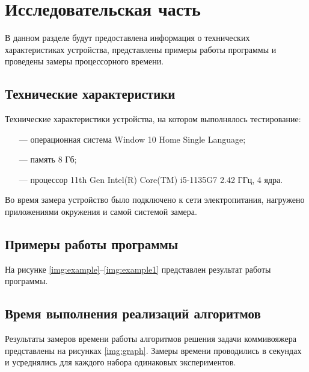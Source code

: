\chapter{Исследовательская часть}

В данном разделе будут предоставлена информация о технических характеристиках устройства, представлены примеры работы программы и проведены замеры процессорного времени.

\section{Технические характеристики}

Технические характеристики устройства, на котором выполнялось тестирование:

\begin{itemize}
	\item[---] операционная система Window 10 Home Single Language;
	\item[---] память 8 Гб;
	\item[---] процессор 11th Gen Intel(R) Core(TM) i5-1135G7 2.42 ГГц, 4 ядра.
\end{itemize}

Во время замера устройство было подключено к сети электропитания, нагружено приложениями окружения и самой системой замера.

\section{Примеры работы программы}

На рисунке \ref{img:example}--\ref{img:example1} представлен результат работы программы.


\clearpage

\section{Время выполнения реализаций алгоритмов}

Результаты замеров времени работы алгоритмов решения задачи коммивояжера представлены на рисунках \ref{img:graph}. Замеры времени проводились в секундах и усреднялись для каждого набора одинаковых экспериментов.


